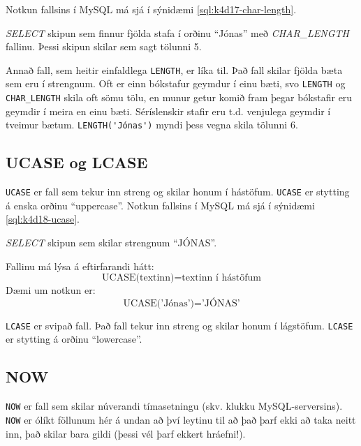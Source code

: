 Notkun fallsins í MySQL má sjá í sýnidæmi \ref{sql:k4d17-char-length}.

\begin{example}[h]
\caption[CHAR\_LENGTH]{\emph{SELECT} skipun sem finnur fjölda stafa í orðinu ``Jónas'' með \emph{CHAR\_LENGTH} fallinu. Þessi skipun skilar sem sagt tölunni 5.}
\label{sql:k4d17-char-length}
\centering
{}
\end{example}

Annað fall, sem heitir einfaldlega \verb|LENGTH|, er líka til. Það fall skilar fjölda bæta sem eru í strengnum. Oft er einn bókstafur geymdur í einu bæti, svo \verb|LENGTH| og \verb|CHAR_LENGTH| skila oft sömu tölu, en munur getur komið fram þegar bókstafir eru geymdir í meira en einu bæti. Séríslenskir stafir eru t.d. venjulega geymdir í tveimur bætum. \verb|LENGTH('Jónas')| myndi þess vegna skila tölunni $6$. 

\subsection{UCASE og LCASE}
\verb|UCASE| er fall sem tekur inn streng og skilar honum í hástöfum. \verb|UCASE| er stytting á enska orðinu ``uppercase''. Notkun fallsins í MySQL má sjá í sýnidæmi \ref{sql:k4d18-ucase}.

\begin{example}[h]
\caption[UCASE]{\emph{SELECT} skipun sem skilar strengnum ``JÓNAS''.}
\label{sql:k4d18-ucase}
\centering
{}
\end{example}

Fallinu má lýsa á eftirfarandi hátt:
\[
\text{UCASE(textinn)} = \text{textinn í hástöfum}
\]
Dæmi um notkun er:
\[
\text{UCASE('Jónas')} = \text{'JÓNAS'}
\]

\verb|LCASE| er svipað fall. Það fall tekur inn streng og skilar honum í lágstöfum. \verb|LCASE| er stytting á orðinu ``lowercase''.
\subsection{NOW}
\verb|NOW| er fall sem skilar núverandi tímasetningu (skv. klukku MySQL-serversins). \verb|NOW| er ólíkt föllunum hér á undan að því leytinu til að það þarf ekki að taka neitt inn, það skilar bara gildi (þessi vél þarf ekkert hráefni!).

